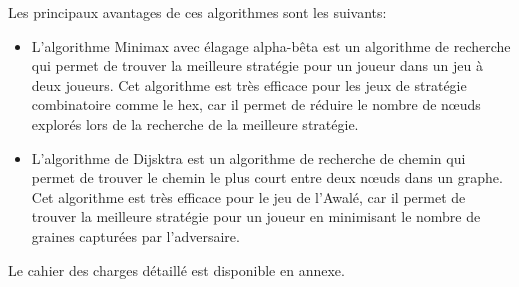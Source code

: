 Les principaux avantages de ces algorithmes sont les suivants:
\begin{itemize}
	\item L'algorithme Minimax avec élagage alpha-bêta est un algorithme de recherche
	qui permet de trouver la meilleure stratégie pour un joueur dans un jeu à deux
	joueurs. Cet algorithme est très efficace pour les jeux de stratégie combinatoire
	comme le hex, car il permet de réduire le nombre de nœuds explorés lors de la
	recherche de la meilleure stratégie.
	\item L'algorithme de Dijsktra est un algorithme de recherche de chemin qui permet
	de trouver le chemin le plus court entre deux nœuds dans un graphe. Cet algorithme
	est très efficace pour le jeu de l'Awalé, car il permet de trouver la meilleure
	stratégie pour un joueur en minimisant le nombre de graines capturées par l'adversaire.
\end{itemize}

Le cahier des charges détaillé est disponible en annexe.